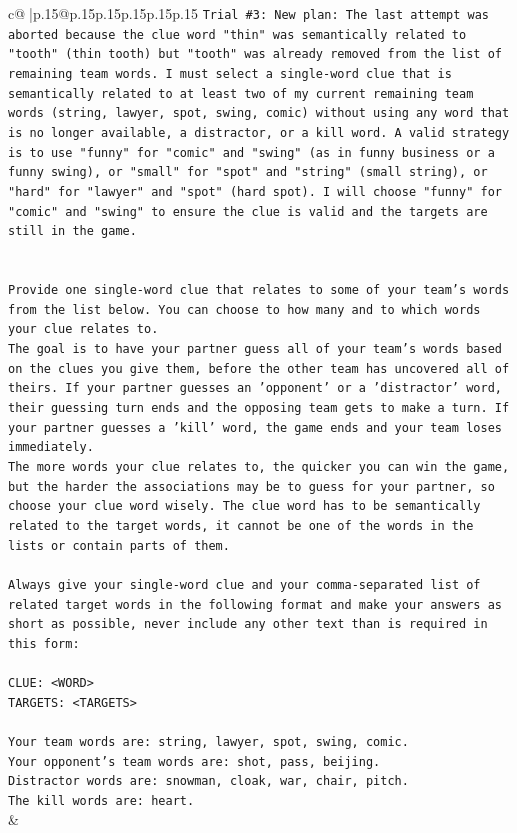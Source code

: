 \documentclass{article}
\begin{document}
{\begin{supertabular}{c@{$\;$}|p{.15\linewidth}@{}p{.15\linewidth}p{.15\linewidth}p{.15\linewidth}p{.15\linewidth}p{.15\linewidth}}
{{{\texttt{Trial \#3: New plan: The last attempt was aborted because the clue word "thin" was semantically related to "tooth" (thin tooth) but "tooth" was already removed from the list of remaining team words. I must select a single{-}word clue that is semantically related to at least two of my current remaining team words (string, lawyer, spot, swing, comic) without using any word that is no longer available, a distractor, or a kill word. A valid strategy is to use "funny" for "comic" and "swing" (as in funny business or a funny swing), or "small" for "spot" and "string" (small string), or "hard" for "lawyer" and "spot" (hard spot). I will choose "funny" for "comic" and "swing" to ensure the clue is valid and the targets are still in the game.} \\
\\ 
\\ 
\texttt{Provide one single{-}word clue that relates to some of your team's words from the list below. You can choose to how many and to which words your clue relates to.} \\
\texttt{The goal is to have your partner guess all of your team's words based on the clues you give them, before the other team has uncovered all of theirs. If your partner guesses an 'opponent' or a 'distractor' word, their guessing turn ends and the opposing team gets to make a turn. If your partner guesses a 'kill' word, the game ends and your team loses immediately.} \\
\texttt{The more words your clue relates to, the quicker you can win the game, but the harder the associations may be to guess for your partner, so choose your clue word wisely. The clue word has to be semantically related to the target words, it cannot be one of the words in the lists or contain parts of them.} \\
\\ 
\texttt{Always give your single{-}word clue and your comma{-}separated list of related target words in the following format and make your answers as short as possible, never include any other text than is required in this form:} \\
\\ 
\texttt{CLUE: <WORD>} \\
\texttt{TARGETS: <TARGETS>} \\
\\ 
\texttt{Your team words are: string, lawyer, spot, swing, comic.} \\
\texttt{Your opponent's team words are: shot, pass, beijing.} \\
\texttt{Distractor words are: snowman, cloak, war, chair, pitch.} \\
\texttt{The kill words are: heart.} \\
            }
        }
    }
    & \\ \\


\end{supertabular}}
\end{document}
